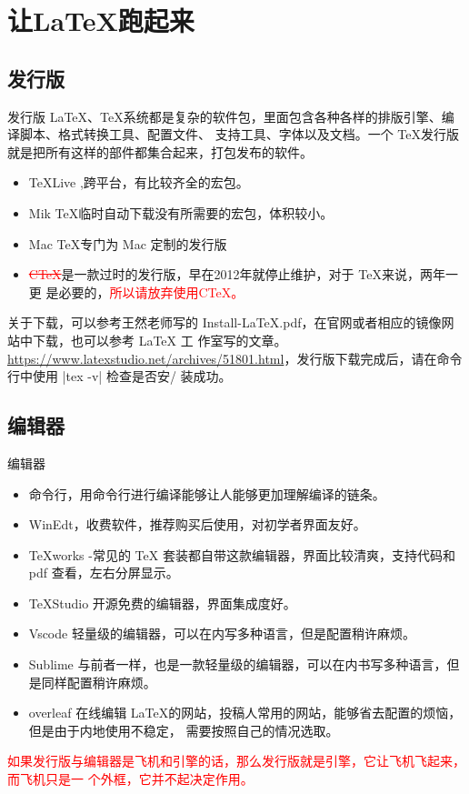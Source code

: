 \section{让\LaTeX 跑起来}

\subsection{发行版}
\begin{frame}{发行版}
	\LaTeX、\TeX 系统都是复杂的软件包，里面包含各种各样的排版引擎、编译脚本、格式转换工具、配置文件、
	支持工具、字体以及文档。一个 \TeX 发行版就是把所有这样的部件都集合起来，打包发布的软件。
	\begin{itemize}
		\item \TeX Live ,跨平台，有比较齐全的宏包。
		\item Mik \TeX 临时自动下载没有所需要的宏包，体积较小。
		\item Mac \TeX 专门为 Mac 定制的发行版
		\item \textcolor{red}{\sout{C\TeX}}是一款过时的发行版，早在2012年就停止维护，对于 \TeX 来说，两年一更
		是必要的，\textcolor{red}{所以请放弃使用C\TeX。}
	\end{itemize}
	关于下载，可以参考王然老师写的 Install-LaTeX.pdf，在官网或者相应的镜像网站中下载，也可以参考 LaTeX 工
	作室写的文章。\\
	\url{https://www.latexstudio.net/archives/51801.html}，发行版下载完成后，请在命令行中使用 |tex -v| 检查是否安/
	装成功。
\end{frame}

\subsection{编辑器}
\begin{frame}{编辑器}
	\begin{itemize}
		\item 命令行，用命令行进行编译能够让人能够更加理解编译的链条。
		\item WinEdt，收费软件，推荐购买后使用，对初学者界面友好。
		\item TeXworks -常见的 TeX 套装都自带这款编辑器，界面比较清爽，支持代码和 pdf 查看，左右分屏显示。
		\item TeXStudio  开源免费的编辑器，界面集成度好。
		\item Vscode 轻量级的编辑器，可以在内写多种语言，但是配置稍许麻烦。
		\item Sublime 与前者一样，也是一款轻量级的编辑器，可以在内书写多种语言，但是同样配置稍许麻烦。
	\end{itemize}
	\begin{itemize}
		\item overleaf 在线编辑 \LaTeX 的网站，投稿人常用的网站，能够省去配置的烦恼，但是由于内地使用不稳定，
		需要按照自己的情况选取。
	\end{itemize}
	
	\textcolor{red}{如果发行版与编辑器是飞机和引擎的话，那么发行版就是引擎，它让飞机飞起来，而飞机只是一
		个外框，它并不起决定作用。}
\end{frame}